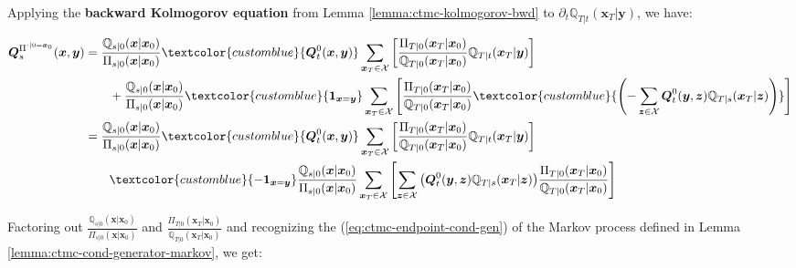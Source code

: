 \documentclass{article}
\newcommand{\bluetext}[1]{\textcolor{customblue}{#1}}
\begin{document}
Applying the \textbf{backward Kolmogorov equation} from Lemma \ref{lemma:ctmc-kolmogorov-bwd} to $\partial_t\mathbb{Q}_{T|t}(\boldsymbol{x}_T|\boldsymbol{y})$, we have:
\begin{small}
\begin{align}
    \boldsymbol{Q}_s^{\Pi^{\cdot|0=\boldsymbol{x}_0}}(\boldsymbol{x},\boldsymbol{y})&=\frac{\mathbb{Q}_{s|0}(\boldsymbol{x}|\boldsymbol{x}_0)}{\Pi_{s|0}(\boldsymbol{x}|\boldsymbol{x}_0)}\bluetext{\boldsymbol{Q}^0_t(\boldsymbol{x},\boldsymbol{y})}\sum_{\boldsymbol{x}_T\in \mathcal{X}}\left[\frac{\Pi_{T|0}(\boldsymbol{x}_T|\boldsymbol{x}_0)}{\mathbb{Q}_{T|0}(\boldsymbol{x}_T|\boldsymbol{x}_0)}\mathbb{Q}_{T|t}(\boldsymbol{x}_T|\boldsymbol{y})\right]\nonumber\\
    &\quad \quad +\frac{\mathbb{Q}_{s|0}(\boldsymbol{x}|\boldsymbol{x}_0)}{\Pi_{s|0}(\boldsymbol{x}|\boldsymbol{x}_0)}\bluetext{\boldsymbol{1}_{\boldsymbol{x}=\boldsymbol{y}}}\sum_{\boldsymbol{x}_T\in \mathcal{X}}\left[\frac{\Pi_{T|0}(\boldsymbol{x}_T|\boldsymbol{x}_0)}{\mathbb{Q}_{T|0}(\boldsymbol{x}_T|\boldsymbol{x}_0)}\bluetext{\left(-\sum_{\boldsymbol{z}\in \mathcal{X}}\boldsymbol{Q}_t^0(\boldsymbol{y}, \boldsymbol{z})\mathbb{Q}_{T|s}(\boldsymbol{x}_T|\boldsymbol{z})\right)}\right]\nonumber\\
    &=\frac{\mathbb{Q}_{s|0}(\boldsymbol{x}|\boldsymbol{x}_0)}{\Pi_{s|0}(\boldsymbol{x}|\boldsymbol{x}_0)}\bluetext{\boldsymbol{Q}^0_t(\boldsymbol{x},\boldsymbol{y})}\sum_{\boldsymbol{x}_T\in \mathcal{X}}\left[\frac{\Pi_{T|0}(\boldsymbol{x}_T|\boldsymbol{x}_0)}{\mathbb{Q}_{T|0}(\boldsymbol{x}_T|\boldsymbol{x}_0)}\mathbb{Q}_{T|t}(\boldsymbol{x}_T|\boldsymbol{y})\right]\nonumber\\
    &\quad \quad \bluetext{-\boldsymbol{1}_{\boldsymbol{x}=\boldsymbol{y}}}\frac{\mathbb{Q}_{s|0}(\boldsymbol{x}|\boldsymbol{x}_0)}{\Pi_{s|0}(\boldsymbol{x}|\boldsymbol{x}_0)}\sum_{\boldsymbol{x}_T\in \mathcal{X}}\left[\sum_{\boldsymbol{z}\in \mathcal{X}}\big(\boldsymbol{Q}_t^0(\boldsymbol{y}, \boldsymbol{z})\mathbb{Q}_{T|s}(\boldsymbol{x}_T|\boldsymbol{z})\big)\frac{\Pi_{T|0}(\boldsymbol{x}_T|\boldsymbol{x}_0)}{\mathbb{Q}_{T|0}(\boldsymbol{x}_T|\boldsymbol{x}_0)}\right]
\end{align}
\end{small}
Factoring out $\frac{\mathbb{Q}_{s|0}(\boldsymbol{x}|\boldsymbol{x}_0)}{\Pi_{s|0}(\boldsymbol{x}|\boldsymbol{x}_0)}$ and $\frac{\Pi_{T|0}(\boldsymbol{x}_T|\boldsymbol{x}_0)}{\mathbb{Q}_{T|0}(\boldsymbol{x}_T|\boldsymbol{x}_0)}$ and recognizing the (\ref{eq:ctmc-endpoint-cond-gen}) of the Markov process defined in Lemma \ref{lemma:ctmc-cond-generator-markov}, we get:
\end{document}
